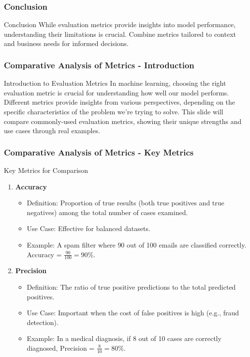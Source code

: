 \documentclass[aspectratio=169]{beamer}
\begin{document}
\begin{frame}[fragile]
    \frametitle{Conclusion}
    \begin{block}{Conclusion}
        While evaluation metrics provide insights into model performance, understanding their limitations is crucial. Combine metrics tailored to context and business needs for informed decisions.
    \end{block}
\end{frame}

\begin{frame}[fragile]
    \frametitle{Comparative Analysis of Metrics - Introduction}
    \begin{block}{Introduction to Evaluation Metrics}
        In machine learning, choosing the right evaluation metric is crucial for understanding how well our model performs. Different metrics provide insights from various perspectives, depending on the specific characteristics of the problem we're trying to solve. This slide will compare commonly-used evaluation metrics, showing their unique strengths and use cases through real examples.
    \end{block}
\end{frame}

\begin{frame}[fragile]
    \frametitle{Comparative Analysis of Metrics - Key Metrics}
    \begin{block}{Key Metrics for Comparison}
        \begin{enumerate}
            \item \textbf{Accuracy}
            \begin{itemize}
                \item Definition: Proportion of true results (both true positives and true negatives) among the total number of cases examined.
                \item Use Case: Effective for balanced datasets.
                \item Example: A spam filter where 90 out of 100 emails are classified correctly. Accuracy = $\frac{90}{100} = 90\%$.
            \end{itemize}

            \item \textbf{Precision}
            \begin{itemize}
                \item Definition: The ratio of true positive predictions to the total predicted positives.
                \item Use Case: Important when the cost of false positives is high (e.g., fraud detection).
                \item Example: In a medical diagnosis, if 8 out of 10 cases are correctly diagnosed, Precision = $\frac{8}{10} = 80\%$.
            \end{itemize}
        \end{enumerate}
    \end{block}
\end{frame}
\end{document}
